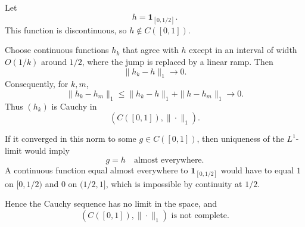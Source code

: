 \begin{solution}
Let
\[
h=\mathbf1_{[0,1/2]}.
\]
This function is discontinuous, so \(h\notin C([0,1])\).

Choose continuous functions \(h_k\) that agree with \(h\) except in an interval of width \(O(1/k)\) around \(1/2\), where the jump is replaced by a linear ramp. Then
\[
\|h_k-h\|_1\longrightarrow0.
\]
Consequently, for \(k,m\),
\[
\|h_k-h_m\|_1
\le
\|h_k-h\|_1+\|h-h_m\|_1
\longrightarrow0.
\]
Thus \((h_k)\) is Cauchy in
\[
(C([0,1]),\|\cdot\|_1).
\]

If it converged in this norm to some \(g\in C([0,1])\), then uniqueness of the \(L^1\)-limit would imply
\[
g=h
\quad\text{almost everywhere}.
\]
A continuous function equal almost everywhere to \(\mathbf1_{[0,1/2]}\) would have to equal \(1\) on \([0,1/2)\) and \(0\) on \((1/2,1]\), which is impossible by continuity at \(1/2\).

Hence the Cauchy sequence has no limit in the space, and
\[
\boxed{
(C([0,1]),\|\cdot\|_1)
\text{ is not complete}.
}
\]
\end{solution}


